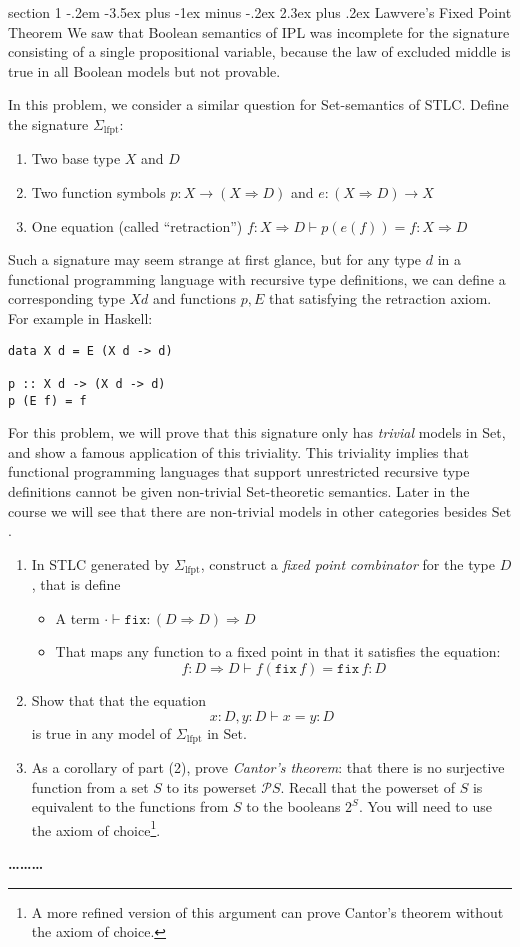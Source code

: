 \documentclass[12pt]{article}
\makeatletter
\newenvironment{problem}{\@startsection
       {section}
       {1}
       {-.2em}
       {-3.5ex plus -1ex minus -.2ex}
       {2.3ex plus .2ex}
       {\pagebreak[3]%
       \large\bf\noindent{Problem }
       }
       }
       {%
       \begin{center}\large\bf \ldots\ldots\ldots\end{center}}
\newcommand{\Set}{\textrm{Set}}
\newcommand{\lfpt}{\Sigma_{\textrm{lfpt}}}
\makeatother
\begin{document}
\begin{problem}{Lawvere's Fixed Point Theorem}
  We saw that Boolean semantics of IPL was incomplete for the
  signature consisting of a single propositional variable, because the
  law of excluded middle is true in all Boolean models but not
  provable.

  In this problem, we consider a similar question for Set-semantics of
  STLC. Define the signature $\lfpt$:
  \begin{enumerate}
  \item Two base type $X$ and $D$
  \item Two function symbols $p : X \to (X \Rightarrow D)$ and $e : (X \Rightarrow D) \to X$
  \item One equation (called ``retraction'') $f : X \Rightarrow D \vdash p(e(f)) = f : X \Rightarrow D$
  \end{enumerate}

  Such a signature may seem strange at first glance, but for any type
  $d$ in a functional programming language with recursive type
  definitions, we can define a corresponding type $X d$ and functions
  $p,E$ that satisfying the retraction axiom. For example in Haskell:
\begin{verbatim}
data X d = E (X d -> d)

p :: X d -> (X d -> d)
p (E f) = f
\end{verbatim}

  For this problem, we will prove that this signature only has
  \emph{trivial} models in Set, and show a famous application of this
  triviality. This triviality implies that functional programming
  languages that support unrestricted recursive type definitions
  cannot be given non-trivial Set-theoretic semantics. Later in the
  course we will see that there are non-trivial models in other
  categories besides $\Set$.
  \begin{enumerate}
  \item In STLC generated by $\lfpt$, construct a
    \emph{fixed point combinator} for the type $D$, that is define
    \begin{itemize}
    \item A term $\cdot \vdash \texttt{fix} : (D \Rightarrow D) \Rightarrow D$
    \item That maps any function to a fixed point in that it satisfies the equation:
      \[ f : D \Rightarrow D \vdash f(\texttt{fix}\,f) = \texttt{fix}\,f : D\]
    \end{itemize}
  \item Show that that the equation
    \[ x:D,y:D \vdash x = y : D \]
    is true in any model of $\lfpt$ in $\Set$.
  \item As a corollary of part (2), prove \emph{Cantor's theorem}:
    that there is no surjective function from a set $S$ to its
    powerset $\mathcal P S$. Recall that the powerset of $S$ is
    equivalent to the functions from $S$ to the booleans $2^S$. You
    will need to use the axiom of choice\footnote{A more refined
    version of this argument can prove Cantor's theorem without the
    axiom of choice.}.
  \end{enumerate}
\end{problem}
\end{document}
